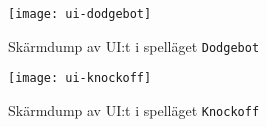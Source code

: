 \begin{figure}[h]
    \centering
    \texttt{[image: ui-dodgebot]}
    \caption{Skärmdump av UI:t i spelläget \texttt{Dodgebot}}
    \label{fig:ui-dodgebot}
\end{figure}

\begin{figure}[h]
    \centering
    \texttt{[image: ui-knockoff]}
    \caption{Skärmdump av UI:t i spelläget \texttt{Knockoff}}
    \label{fig:ui-knockoff}
\end{figure}